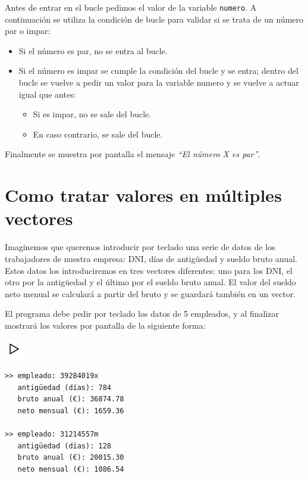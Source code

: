 \documentclass[
]{book}
\providecommand{\tightlist}{%
  \setlength{\itemsep}{0pt}\setlength{\parskip}{0pt}}
\begin{document}
Antes de entrar en el bucle pedimos el valor de la variable \texttt{numero}. A continuación se utiliza la condición de bucle para validar si se trata de un número par o impar:

\begin{itemize}
\tightlist
\item
  Si el número es par, no se entra al bucle.
\item
  Si el número es impar se cumple la condición del bucle y se entra; dentro del bucle se vuelve a pedir un valor para la variable numero y se vuelve a actuar igual que antes:

  \begin{itemize}
  \tightlist
  \item
    Si es impar, no se sale del bucle.
  \item
    En caso contrario, se sale del bucle.
  \end{itemize}
\end{itemize}

Finalmente se muestra por pantalla el mensaje \emph{``El número X es par''}.

\hypertarget{como-tratar-valores-en-muxfaltiples-vectores}{%
\section{Como tratar valores en múltiples vectores}\label{como-tratar-valores-en-muxfaltiples-vectores}}

Imaginemos que queremos introducir por teclado una serie de datos de los trabajadores de nuestra empresa: DNI, días de antigüedad y sueldo bruto anual. Estos datos los introduciremos en tres vectores diferentes: uno para los DNI, el otro por la antigüedad y el último por el sueldo bruto anual. El valor del sueldo neto menual se calculará a partir del bruto y se guardará también en un vector.

El programa debe pedir por teclado los datos de 5 empleados, y al finalizar mostrará los valores por pantalla de la siguiente forma:

\includegraphics{./img/play.png}

\begin{verbatim}
>> empleado: 39284019x
   antigüedad (días): 784
   bruto anual (€): 36874.78
   neto mensual (€): 1659.36

>> empleado: 31214557m
   antigüedad (días): 128
   bruto anual (€): 20015.30
   neto mensual (€): 1086.54
\end{verbatim}
\end{document}

